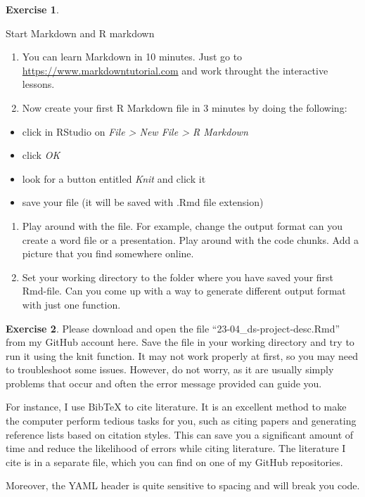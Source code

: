 \documentclass[
  12pt,
  oneside]{book}
\providecommand{\tightlist}{%
  \setlength{\itemsep}{0pt}\setlength{\parskip}{0pt}}
\theoremstyle{definition}
\theoremstyle{definition}
\theoremstyle{definition}
\newtheorem{exercise}{Exercise}[chapter]
\theoremstyle{definition}
\theoremstyle{remark}
\begin{document}
\begin{exercise}
\protect\hypertarget{exr:rmdfirst}{}\label{exr:rmdfirst}

Start Markdown and R markdown

\begin{enumerate}
\def\labelenumi{\alph{enumi})}
\tightlist
\item
  You can learn Markdown in 10 minutes. Just go to \url{https://www.markdowntutorial.com} and work throught the interactive lessons.
\item
  Now create your first R Markdown file in 3 minutes by doing the following:
\end{enumerate}

\begin{itemize}
\tightlist
\item
  click in RStudio on \emph{File \textgreater{} New File \textgreater{} R Markdown}
\item
  click \emph{OK}
\item
  look for a button entitled \emph{Knit} and click it
\item
  save your file (it will be saved with .Rmd file extension)
\end{itemize}

\begin{enumerate}
\def\labelenumi{\alph{enumi})}
\setcounter{enumi}{2}
\tightlist
\item
  Play around with the file. For example, change the output format can you create a word file or a presentation. Play around with the code chunks. Add a picture that you find somewhere online.
\item
  Set your working directory to the folder where you have saved your first Rmd-file. Can you come up with a way to generate different output format with just one function.
\end{enumerate}

\end{exercise}

\begin{exercise}
\protect\hypertarget{exr:rmdsecond}{}\label{exr:rmdsecond}Please download and open the file ``23-04\_ds-project-desc.Rmd'' from my GitHub account here. Save the file in your working directory and try to run it using the knit function. It may not work properly at first, so you may need to troubleshoot some issues. However, do not worry, as it are usually simply problems that occur and often the error message provided can guide you.

For instance, I use BibTeX to cite literature. It is an excellent method to make the computer perform tedious tasks for you, such as citing papers and generating reference lists based on citation styles. This can save you a significant amount of time and reduce the likelihood of errors while citing literature. The literature I cite is in a separate file, which you can find on one of my GitHub repositories.

Moreover, the YAML header is quite sensitive to spacing and will break you code.
\end{exercise}
\end{document}
